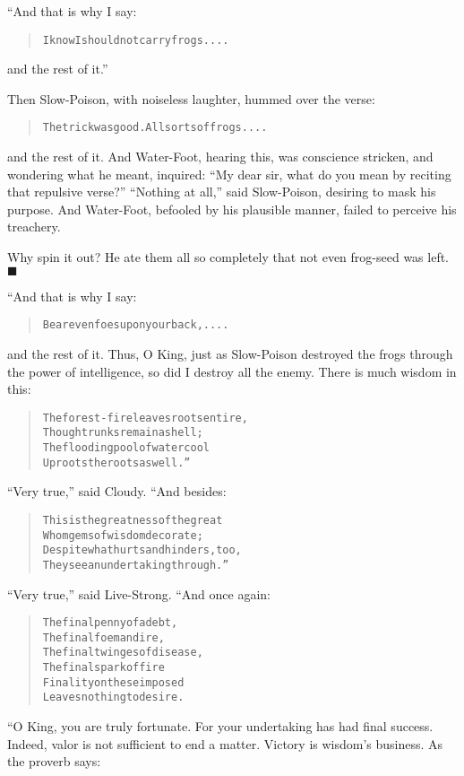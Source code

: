\documentclass[article, twoside, 14pt]{memoir}
\newcommand{\qed}{\hfill \ensuremath{\blacksquare}}
\renewenvironment{verbatim}{%
\begin{quote}%
\vskip -10pt%
\begin{alltt}\normalfont\large}{\end{alltt}%
\end{quote}%
\vskip -10pt
} %
\begin{document}
“And that is why I say:

\begin{verbatim}
I know I should not carry frogs ....
\end{verbatim}
and the rest of it.”

Then Slow-Poison, with noiseless laughter, hummed over the verse:

\begin{verbatim}
The trick was good. All sorts of frogs ....
\end{verbatim}
and the rest of it. And Water-Foot, hearing this, was
conscience stricken, and wondering what he meant, inquired:
``My dear sir, what do you mean by reciting that repulsive verse?''
``Nothing at all,'' said Slow-Poison, desiring to mask his purpose.
And Water-Foot, befooled by his plausible manner, failed to
perceive his treachery.

Why spin it out? He ate them all so completely that not even
frog-seed was left.\hyperref[s63]{\qed}

“And that is why I say:

\begin{verbatim}
Bear even foes upon your back, ....
\end{verbatim}
and the rest of it. Thus, O King, just as Slow-Poison destroyed the
frogs through the power of intelligence, so did I destroy all the
enemy. There is much wisdom in this:

\begin{verbatim}
The forest-fire leaves roots entire,
    Though trunks remain a shell;
The flooding pool of water cool
    Uproots the roots as well.”
\end{verbatim}
``Very true,'' said Cloudy. “And besides:

\begin{verbatim}
This is the greatness of the great
Whom gems of wisdom decorate;
Despite what hurts and hinders, too,
They see an undertaking through.”
\end{verbatim}
``Very true,'' said Live-Strong. “And once again:

\begin{verbatim}
The final penny of a debt,
    The final foeman dire,
The final twinges of disease,
    The final spark of fire{\textemdash}
Finality on these imposed
    Leaves nothing to desire.
\end{verbatim}
“O King, you are truly fortunate. For your undertaking has had
final success. Indeed, valor is not sufficient to end a matter.
Victory is wisdom's business. As the proverb says:
\end{document}
